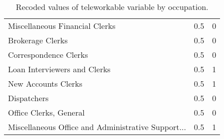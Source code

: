 \begin{table}
\begin{tabular}{lrr}
Miscellaneous Financial Clerks                     &           0.5 &       0 \\
Brokerage Clerks                                   &           0.5 &       0 \\
Correspondence Clerks                              &           0.5 &       0 \\
Loan Interviewers and Clerks                       &           0.5 &       1 \\
New Accounts Clerks                                &           0.5 &       1 \\
Dispatchers                                        &           0.5 &       0 \\
Office Clerks, General                             &           0.5 &       0 \\
Miscellaneous Office and Administrative Support... &           0.5 &       1 \\
\bottomrule
\end{tabular}
\caption{Recoded values of teleworkable variable by occupation.}
\label{teleworkable_recode}
\end{table}